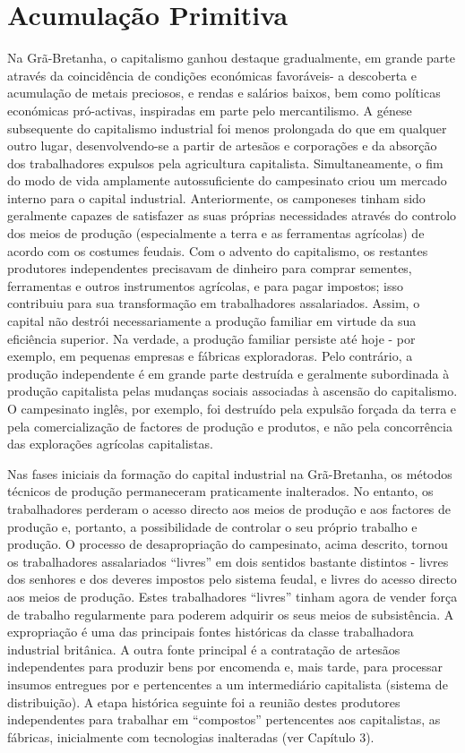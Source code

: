 \section{Acumulação Primitiva}
 \par 
Na Grã-Bretanha, o capitalismo ganhou destaque gradualmente, em grande parte através da coincidência de condições económicas favoráveis ​​- a descoberta e acumulação de metais preciosos, e rendas e salários baixos, bem como políticas económicas pró-activas, inspiradas em parte pelo mercantilismo. A génese subsequente do capitalismo industrial foi menos prolongada do que em qualquer outro lugar, desenvolvendo-se a partir de artesãos e corporações e da absorção dos trabalhadores expulsos pela agricultura capitalista. Simultaneamente, o fim do modo de vida amplamente autossuficiente do campesinato criou um mercado interno para o capital industrial. Anteriormente, os camponeses tinham sido geralmente capazes de satisfazer as suas próprias necessidades através do controlo dos meios de produção (especialmente a terra e as ferramentas agrícolas) de acordo com os costumes feudais. Com o advento do capitalismo, os restantes produtores independentes precisavam de dinheiro para comprar sementes, ferramentas e outros instrumentos agrícolas, e para pagar impostos; isso contribuiu para sua transformação em trabalhadores assalariados. Assim, o capital não destrói necessariamente a produção familiar em virtude da sua eficiência superior. Na verdade, a produção familiar persiste até hoje - por exemplo, em pequenas empresas e fábricas exploradoras. Pelo contrário, a produção independente é em grande parte destruída e geralmente subordinada à produção capitalista pelas mudanças sociais associadas à ascensão do capitalismo. O campesinato inglês, por exemplo, foi destruído pela expulsão forçada da terra e pela comercialização de factores de produção e produtos, e não pela concorrência das explorações agrícolas capitalistas.
 \par 
Nas fases iniciais da formação do capital industrial na Grã-Bretanha, os métodos técnicos de produção permaneceram praticamente inalterados. No entanto, os trabalhadores perderam o acesso directo aos meios de produção e aos factores de produção e, portanto, a possibilidade de controlar o seu próprio trabalho e produção. O processo de desapropriação do campesinato, acima descrito, tornou os trabalhadores assalariados “livres” em dois sentidos bastante distintos - livres dos senhores e dos deveres impostos pelo sistema feudal, e livres do acesso directo aos meios de produção. Estes trabalhadores “livres” tinham agora de vender força de trabalho regularmente para poderem adquirir os seus meios de subsistência. A expropriação é uma das principais fontes históricas da classe trabalhadora industrial britânica. A outra fonte principal é a contratação de artesãos independentes para produzir bens por encomenda e, mais tarde, para processar insumos entregues por e pertencentes a um intermediário capitalista (sistema de distribuição). A etapa histórica seguinte foi a reunião destes produtores independentes para trabalhar em “compostos” pertencentes aos capitalistas, as fábricas, inicialmente com tecnologias inalteradas (ver Capítulo {\color{blue}3}).

